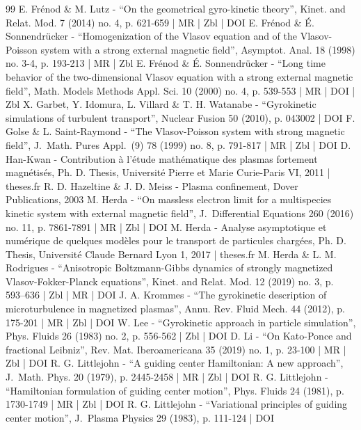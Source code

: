 \documentclass[10pt]{amsart}
\theoremstyle{plain}
\theoremstyle{definition}
\begin{document}
\begin{thebibliography}{99}
E. Frénod \& M. Lutz - “On the geometrical gyro-kinetic theory”, Kinet. and Relat. Mod. 7 (2014) no. 4, p. 621-659 | MR | Zbl | DOI
E. Frénod \& É. Sonnendrücker - “Homogenization of the Vlasov equation and of the Vlasov-Poisson system with a strong external magnetic field”, Asymptot. Anal. 18 (1998) no. 3-4, p. 193-213 | MR | Zbl
E. Frénod \& É. Sonnendrücker - “Long time behavior of the two-dimensional Vlasov equation with a strong external magnetic field”, Math. Models Methods Appl. Sci. 10 (2000) no. 4, p. 539-553 | MR | DOI | Zbl
X. Garbet, Y. Idomura, L. Villard \& T. H. Watanabe - “Gyrokinetic simulations of turbulent transport”, Nuclear Fusion 50 (2010), p. 043002 | DOI
F. Golse \& L. Saint-Raymond - “The Vlasov-Poisson system with strong magnetic field”, J. Math. Pures Appl. (9) 78 (1999) no. 8, p. 791-817 | MR | Zbl | DOI
D. Han-Kwan - Contribution à l’étude mathématique des plasmas fortement magnétisés, Ph. D. Thesis, Université Pierre et Marie Curie-Paris VI, 2011 | theses.fr
R. D. Hazeltine \& J. D. Meiss - Plasma confinement, Dover Publications, 2003
M. Herda - “On massless electron limit for a multispecies kinetic system with external magnetic field”, J. Differential Equations 260 (2016) no. 11, p. 7861-7891 | MR | Zbl | DOI
M. Herda - Analyse asymptotique et numérique de quelques modèles pour le transport de particules chargées, Ph. D. Thesis, Université Claude Bernard Lyon 1, 2017 | theses.fr
M. Herda \& L. M. Rodrigues - “Anisotropic Boltzmann-Gibbs dynamics of strongly magnetized Vlasov-Fokker-Planck equations”, Kinet. and Relat. Mod. 12 (2019) no. 3, p. 593–636 | Zbl | MR | DOI
J. A. Krommes - “The gyrokinetic description of microturbulence in magnetized plasmas”, Annu. Rev. Fluid Mech. 44 (2012), p. 175-201 | MR | Zbl | DOI
W. Lee - “Gyrokinetic approach in particle simulation”, Phys. Fluids 26 (1983) no. 2, p. 556-562 | Zbl | DOI
D. Li - “On Kato-Ponce and fractional Leibniz”, Rev. Mat. Iberoamericana 35 (2019) no. 1, p. 23-100 | MR | Zbl | DOI
R. G. Littlejohn - “A guiding center Hamiltonian: A new approach”, J. Math. Phys. 20 (1979), p. 2445-2458 | MR | Zbl | DOI
R. G. Littlejohn - “Hamiltonian formulation of guiding center motion”, Phys. Fluids 24 (1981), p. 1730-1749 | MR | Zbl | DOI
R. G. Littlejohn - “Variational principles of guiding center motion”, J. Plasma Physics 29 (1983), p. 111-124 | DOI

\end{thebibliography}
\end{document}
